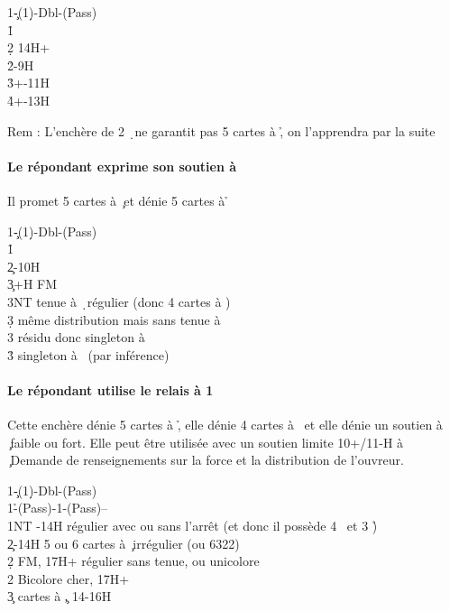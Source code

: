 \documentclass[a4paper]{article}
\begin{document}
\begin{bidtable}
1\c-(1\d)-Dbl-(Pass)\\
1\h\+\\
2\d \> 14H+\\
2\h {}-9H\\
3\h {}+-11H\\
4\h {}+-13H\-
\end{bidtable}

Rem : L’enchère de 2 \d\ ne garantit pas 5 cartes à \h , on l’apprendra par la suite

\paragraph{Le répondant exprime son soutien à \pdfc}

Il promet 5 cartes à \c\ et dénie 5 cartes à \h 

\begin{bidtable}
1\c-(1\d)-Dbl-(Pass)\\
1\h\+\\
2\c {}-10H\\
3\c {}+H FM\+\\
3NT \> tenue à \d\ régulier (donc 4 cartes à \s )\\
3\d \> même distribution mais sans tenue à \d \\
3\s \> résidu donc singleton à \d \\
3\h \> singleton à \s\ (par inférence)\-\-
\end{bidtable}

\paragraph{Le répondant utilise le relais à 1 \pdfs}

Cette enchère dénie 5 cartes à \h , elle dénie 4 cartes à \s\ et elle dénie un soutien à \c\ faible ou fort.
Elle peut être utilisée avec un soutien limite 10+/11-H à \c\ 
Demande de renseignements sur la force et la distribution de l’ouvreur.

\begin{bidtable}
1\c-(1\d)-Dbl-(Pass)\\
1\h-(Pass)-1\s-(Pass)--\\
1NT -14H régulier avec ou sans l’arrêt (et donc il possède 4 \s\ et 3 \h )\\
2\c \> 12-14H 5 ou 6 cartes à \c\ irrégulier (ou 6322)\\
2\d \> FM, 17H+ régulier sans tenue, ou unicolore \c \\
2\s \> Bicolore cher, 17H+\\
3\c {} cartes à \c , 14-16H
\end{bidtable}
\end{document}
